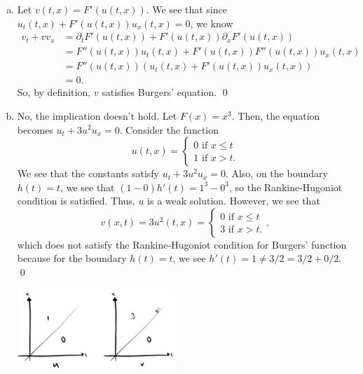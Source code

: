 \documentclass{article}
\renewcommand{\d}{\partial}
\begin{document}
\begin{enumerate}[(a)]
    \item Let $v(t,x) = F'(u(t,x))$. We see that since $u_t(t,x) + F'(u(t,x))u_x(t,x) = 0$, we know 
    \begin{align*}
        v_t + vv_x &= \d_tF'(u(t,x)) + F'(u(t,x))\d_xF'(u(t,x))\\
        &= F''(u(t,x))u_t(t,x) + F'(u(t,x))F''(u(t,x))u_x(t,x) \\
        &=F''(u(t,x))(u_t(t,x) + F'(u(t,x))u_x(t,x))\\
        &= 0.
    \end{align*}
    So, by definition, $v$ satisfies Burgers' equation. \qed
    \item No, the implication doesn't hold. Let $F(x) = x^3$. Then, the equation becomes $u_t + 3u^2u_x = 0$. Consider the function 
    \[u(t,x) = \begin{cases}
        0 \text{ if } x \le t \\
        1 \text{ if } x > t.
    \end{cases}\]
    We see that the constants satisfy $u_t + 3u^2u_x = 0$. Also, on the boundary $h(t) = t$, we see that $(1-0)h'(t) = 1^3 - 0^3$, so the Rankine-Hugoniot condition is satisfied. Thus, $u$ is a weak solution. However, we see that 
    \[v(x,t) = 3u^2(t,x) = \begin{cases}
        0 \text{ if } x \le t \\
        3 \text{ if } x > t.
    \end{cases},\]
    which does not satisfy the Rankine-Hugoniot condition for Burgers' function because for the boundary $h(t) = t$, we see $h'(t) = 1 \ne 3/2 = 3/2+0/2$. \qed 
    \begin{center}
        \includegraphics[height=3cm]{../images/uv}
    \end{center}
\end{enumerate}
\end{document}

